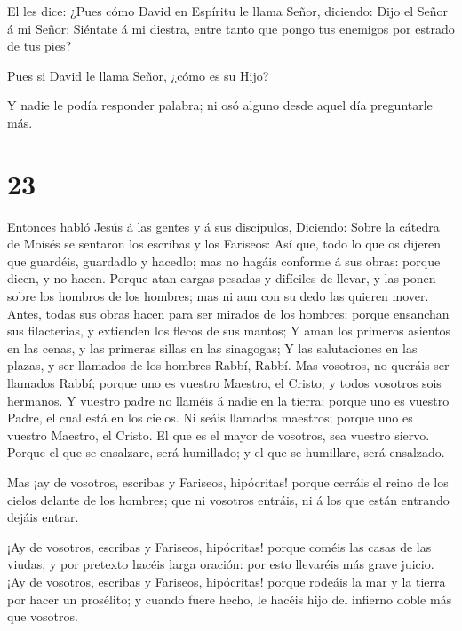  El les dice: ¿Pues cómo David en Espíritu le llama Señor,
diciendo:  Dijo el Señor á mi Señor: Siéntate á mi diestra,
entre tanto que pongo tus enemigos por estrado de tus pies?

 Pues si David le llama Señor, ¿cómo es su Hijo?

 Y nadie le podía responder palabra; ni osó alguno desde
aquel día preguntarle más.

\hypertarget{section-22}{%
\section{23}\label{section-22}}

 Entonces habló Jesús á las gentes y á sus discípulos,
 Diciendo: Sobre la cátedra de Moisés se sentaron los
escribas y los Fariseos:  Así que, todo lo que os dijeren
que guardéis, guardadlo y hacedlo; mas no hagáis conforme á sus obras:
porque dicen, y no hacen.  Porque atan cargas pesadas y
difíciles de llevar, y las ponen sobre los hombros de los hombres; mas
ni aun con su dedo las quieren mover.  Antes, todas sus
obras hacen para ser mirados de los hombres; porque ensanchan sus
filacterias, y extienden los flecos de sus mantos;  Y aman
los primeros asientos en las cenas, y las primeras sillas en las
sinagogas;  Y las salutaciones en las plazas, y ser llamados
de los hombres Rabbí, Rabbí.  Mas vosotros, no queráis ser
llamados Rabbí; porque uno es vuestro Maestro, el Cristo; y todos
vosotros sois hermanos.  Y vuestro padre no llaméis á nadie
en la tierra; porque uno es vuestro Padre, el cual está en los cielos.
 Ni seáis llamados maestros; porque uno es vuestro Maestro,
el Cristo.  El que es el mayor de vosotros, sea vuestro
siervo.  Porque el que se ensalzare, será humillado; y el
que se humillare, será ensalzado.

 Mas ¡ay de vosotros, escribas y Fariseos, hipócritas!
porque cerráis el reino de los cielos delante de los hombres; que ni
vosotros entráis, ni á los que están entrando dejáis entrar.

 ¡Ay de vosotros, escribas y Fariseos, hipócritas! porque
coméis las casas de las viudas, y por pretexto hacéis larga oración: por
esto llevaréis más grave juicio.  ¡Ay de vosotros, escribas
y Fariseos, hipócritas! porque rodeáis la mar y la tierra por hacer un
prosélito; y cuando fuere hecho, le hacéis hijo del infierno doble más
que vosotros.

